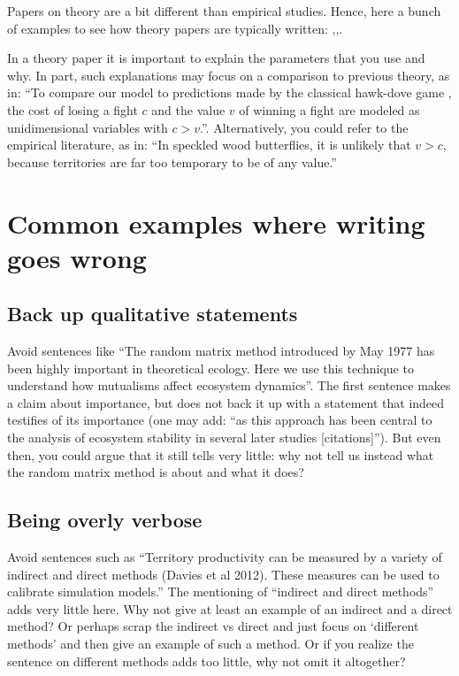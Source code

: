 \documentclass[
]{book}
\begin{document}
Papers on theory are a bit different than empirical studies. Hence, here a bunch of examples to see how theory papers are typically written: \citep{Fawcett2007},\citep{Trimmer2015},\citep{Kahn2015}.

In a theory paper it is important to explain the parameters that you use and why. In part, such explanations may focus on a comparison to previous theory, as in: ``To compare our model to predictions made by the classical hawk-dove game \citep{MaynardSmith1973}, the cost of losing a fight \(c\) and the value \(v\) of winning a fight are modeled as unidimensional variables with \(c > v\).''. Alternatively, you could refer to the empirical literature, as in: ``In speckled wood butterflies, it is unlikely that \(v>c\), because territories are far too temporary to be of any value.''

\hypertarget{common-examples-where-writing-goes-wrong}{%
\section{Common examples where writing goes wrong}\label{common-examples-where-writing-goes-wrong}}

\hypertarget{back-up-qualitative-statements}{%
\subsection{Back up qualitative statements}\label{back-up-qualitative-statements}}

Avoid sentences like ``The random matrix method introduced by May 1977 has been highly important in theoretical ecology. Here we use this technique to understand how mutualisms affect ecosystem dynamics''. The first sentence makes a claim about importance, but does not back it up with a statement that indeed testifies of its importance (one may add: ``as this approach has been central to the analysis of ecosystem stability in several later studies {[}citations{]}''). But even then, you could argue that it still tells very little: why not tell us instead what the random matrix method is about and what it does?

\hypertarget{being-overly-verbose}{%
\subsection{Being overly verbose}\label{being-overly-verbose}}

Avoid sentences such as ``Territory productivity can be measured by a variety of
indirect and direct methods (Davies et al 2012). These measures
can be used to calibrate simulation models.'' The mentioning of
``indirect and direct methods'' adds very little here. Why not give at least an
example of an indirect and a direct method? Or perhaps scrap the indirect vs direct and
just focus on `different methods' and then give an example of such a method.
Or if you realize the sentence on different methods adds too little, why not omit it altogether?
\end{document}
